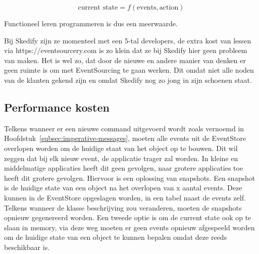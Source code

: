\begin{equation}
\text{current state} = f(\text{events}, \text{action})
\end{equation}

Functioneel leren programmeren is dus een meerwaarde.

Bij Skedify zijn ze momenteel met een 5-tal developers, de extra kost van lessen via https://eventsourcery.com is zo klein dat ze bij Skedify hier geen probleem van maken. Het is wel zo, dat door de nieuwe en andere manier van denken er geen ruimte is om met EventSourcing te gaan werken. Dit omdat niet alle noden van de klanten gekend zijn en omdat Skedify nog zo jong in zijn schoenen staat.

\subsection{Performance kosten}
\label{subsec:performance-kosten}

Telkens wanneer er een nieuwe command uitgevoerd wordt zoals vernoemd in Hoofdstuk~\ref{subsec:imperative-messages}, moeten alle events uit de EventStore overlopen worden om de huidige staat van het object op te bouwen. Dit wil zeggen dat bij elk nieuw event, de applicatie trager zal worden. In kleine en middelmatige applicaties heeft dit geen gevolgen, naar grotere applicaties toe heeft dit grotere gevolgen. Hiervoor is een oplossing van snapshots. Een snapshot is de huidige state van een object na het overlopen van x aantal events. Deze kunnen in de EventStore opgeslagen worden, in een tabel naast de events zelf. Telkens wanneer de klasse beschrijving zou veranderen, moeten de snapshots opnieuw gegenereerd worden. Een tweede optie is om de current state ook op te slaan in memory, via deze weg moeten er geen events opnieuw afgespeeld worden om de huidige state van een object te kunnen bepalen omdat deze reeds beschikbaar is.
